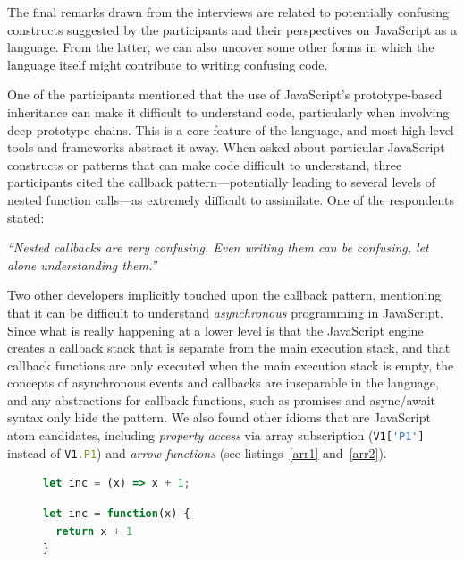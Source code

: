 The final remarks drawn from the interviews are related to potentially confusing constructs suggested by the participants and their perspectives on JavaScript as a language. From the latter, we can also uncover some other forms in which the language itself might contribute to writing confusing code.

One of the participants mentioned that the use of JavaScript's prototype-based inheritance can make it difficult to understand code, particularly when involving deep prototype chains. This is a core feature of the language, and most high-level tools and frameworks abstract it away.
When asked about particular JavaScript constructs or patterns that can make code difficult to understand, three participants cited the callback pattern---potentially leading to several levels of nested function calls---as extremely difficult to assimilate. One of the respondents stated:

\begin{mq}
\emph{``Nested callbacks are very confusing. Even writing them can be confusing, let alone understanding them.''}
\end{mq}

Two other developers implicitly touched upon the callback pattern, mentioning that it can be difficult to understand \emph{asynchronous} programming in JavaScript. Since what is really happening at a lower level is that the JavaScript engine creates a callback stack that is separate from the main execution stack, and that callback functions are only executed when the main execution stack is empty, the concepts of asynchronous events and callbacks are inseparable in the language, and any abstractions for callback functions, such as promises and async/await syntax only hide the pattern. We also found other idioms that are JavaScript atom candidates, including
\emph{property access} via array subscription (\lstinline[language=javascript]{V1['P1']} instead of \lstinline[language=javascript]{V1.P1}) and \emph{arrow functions} (see listings~\ref{arr1} and~\ref{arr2}). 

\begin{figure}
\begin{small}
\begin{lstlisting}[language=JavaScript,caption=Example of arrow function.,label=arr1]
let inc = (x) => x + 1;
\end{lstlisting}
\begin{lstlisting}[language=JavaScript,caption=Alternative version without arrow function.,label=arr2]
let inc = function(x) {
  return x + 1
}
\end{lstlisting}
\vspace*{-0.6cm}
\end{small}
\end{figure}

